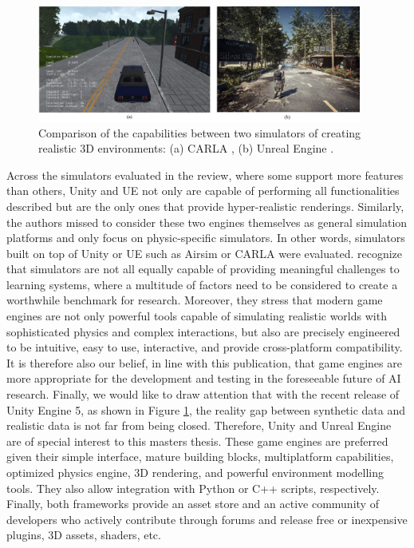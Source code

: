 \begin{figure}[!ht]
    \centering
    \includegraphics[width=0.95\textwidth]{images/carla-vs-unreal.jpg}
    \caption{Comparison of the capabilities between two simulators of creating realistic 3D environments: (a) CARLA \cite{Dosovitskiy17}, (b) Unreal Engine \cite{scionti2021unreal5}.}
    \label{fig:carla-vs-unreal}
\end{figure}
    

Across the simulators evaluated in the review, where some support more features than others, Unity and UE not only are capable of performing all functionalities described but are the only ones that provide hyper-realistic renderings. Similarly, the authors missed to consider these two engines themselves as general simulation platforms and only focus on physic-specific simulators. In other words, simulators built on top of Unity or UE such as Airsim or CARLA were evaluated. \textcite{juliani2018unity} recognize that simulators are not all equally capable of providing meaningful challenges to learning systems, where a multitude of factors need to be considered to create a worthwhile benchmark for research. Moreover, they stress that modern game engines are not only powerful tools capable of simulating realistic worlds with sophisticated physics and complex interactions, but also are precisely engineered to be intuitive, easy to use, interactive, and provide cross-platform compatibility. It is therefore also our belief, in line with this publication, that game engines are more appropriate for the development and testing in the foreseeable future of AI research. Finally, we would like to draw attention that with the recent release of Unity Engine 5, as shown in Figure \ref{fig:carla-vs-unreal}, the reality gap between synthetic data and realistic data is not far from being closed. Therefore, Unity and Unreal Engine are of special interest to this masters thesis. These game engines are preferred given their simple interface, mature building blocks, multiplatform capabilities, optimized physics engine, 3D rendering, and powerful environment modelling tools. They also allow integration with Python or C++ scripts, respectively. Finally, both frameworks provide an asset store and an active community of developers who actively contribute through forums and release free or inexpensive plugins, 3D assets, shaders, etc.

